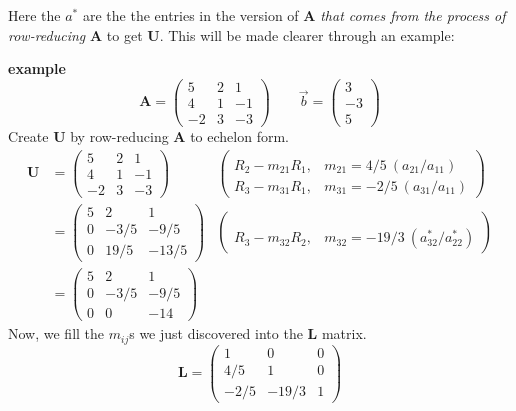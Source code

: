 \documentclass[12pt, answers]{exam}
\newcommand{\ve}[1]{\ensuremath{\mathbf{#1}}}
\begin{document}
Here the $a^*$ are the the entries in the version of $\ve{A}$ \textit{that comes from the process of row-reducing} $\ve{A}$ to get $\ve{U}$. This will be made clearer through an example:

\textbf{example}
\begin{equation}
\ve{A} = \begin{pmatrix}
  5  & 2 & 1 \\
  4  & 1 & -1 \\
  -2 & 3 & -3
\end{pmatrix}
\qquad 
\vec{b}= \begin{pmatrix}
3 \\ -3 \\ 5
\end{pmatrix} \nonumber
\end{equation}
%
%
Create $\ve{U}$ by row-reducing $\ve{A}$ to echelon form. 
\begin{align}
\ve{U} &= \begin{pmatrix}
  5  & 2 & 1 \\
  4  & 1 & -1 \\
  -2 & 3 & -3
\end{pmatrix} 
&\begin{pmatrix}
 & \\ R_2 - m_{21}R_1, & m_{21} = 4/5 \:(a_{21}/a_{11})\\ 
      R_3 - m_{31}R_1, & m_{31} = -2/5 \:(a_{31}/a_{11})\end{pmatrix}  
\nonumber \\
%
&= \begin{pmatrix}
  5 & 2    & 1 \\
  0 & -3/5 & -9/5 \\
  0 & 19/5 & -13/5
\end{pmatrix} 
&\begin{pmatrix}
 & \\ & \\ R_3 - m_{32}R_2, & m_{32} = -19/3 \:(a^{*}_{32}/a^{*}_{22})\end{pmatrix} \nonumber \\                   
%
&= \begin{pmatrix}
  5 & 2    & 1 \\
  0 & -3/5 & -9/5 \\
  0 & 0    & -14
\end{pmatrix} 
\end{align}
%
Now, we fill the $m_{ij}$s we just discovered into the $\ve{L}$ matrix.
%
\begin{equation}
\ve{L} = \begin{pmatrix}
  1    & 0     & 0 \\
  4/5  & 1     & 0 \\
  -2/5 & -19/3 & 1
\end{pmatrix} \nonumber
\end{equation}
\end{document}
